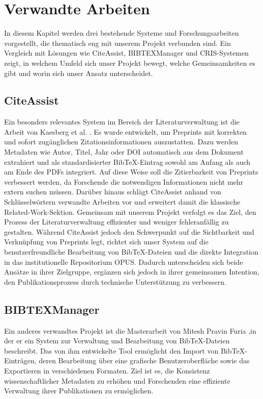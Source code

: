 \chapter{Verwandte Arbeiten}
In diesem Kapitel werden drei bestehende Systeme und Forschungsarbeiten 
vorgestellt, die thematisch eng mit unserem Projekt verbunden sind. 
Ein Vergleich mit Lösungen wie CiteAssist, BIBTEXManager und CRIS-Systemen 
zeigt, in welchem Umfeld sich unser Projekt bewegt, welche Gemeinsamkeiten 
es gibt und worin sich unser Ansatz unterscheidet.

\section{CiteAssist}
Ein besonders relevantes System im Bereich der Literaturverwaltung ist die Arbeit von  
Kaesberg et al. \cite{kaesberg2024citeassist}. 
Es wurde entwickelt, um Preprints mit korrekten und sofort 
zugänglichen Zitationsinformationen auszustatten. Dazu werden 
Metadaten wie Autor, Titel, Jahr oder DOI automatisch aus dem 
Dokument extrahiert und als standardisierter BibTeX-Eintrag 
sowohl am Anfang als auch am Ende des PDFs integriert. Auf 
diese Weise soll die Zitierbarkeit von Preprints verbessert 
werden, da Forschende die notwendigen Informationen nicht 
mehr extern suchen müssen. Darüber hinaus schlägt CiteAssist 
anhand von Schlüsselwörtern verwandte Arbeiten vor und 
erweitert damit die klassische Related-Work-Sektion. 
Gemeinsam mit unserem Projekt verfolgt es das Ziel, 
den Prozess der Literaturverwaltung effizienter und 
weniger fehleranfällig zu gestalten. Während CiteAssist 
jedoch den Schwerpunkt auf die Sichtbarkeit und Verknüpfung 
von Preprints legt, richtet sich unser System auf die 
benutzerfreundliche Bearbeitung von BibTeX-Dateien und 
die direkte Integration in das institutionelle Repositorium 
OPUS. Dadurch unterscheiden sich beide Ansätze in ihrer 
Zielgruppe, ergänzen sich jedoch in ihrer gemeinsamen Intention, 
den Publikationsprozess durch technische Unterstützung zu verbessern.

\section{BIBTEXManager}

Ein anderes  verwandtes Projekt ist die Masterarbeit von Mitesh Pravin Furia \cite{furia2009},in der er  ein 
System zur Verwaltung und Bearbeitung von Bib\TeX{}-Dateien beschreibt. 
Das von ihm  entwickelte Tool ermöglicht den Import von Bib\TeX{}-Einträgen, 
deren Bearbeitung über eine grafische Benutzeroberfläche sowie das Exportieren 
in verschiedenen Formaten. Ziel ist es, die Konsistenz wissenschaftlicher 
Metadaten zu erhöhen und Forschenden eine effiziente Verwaltung ihrer 
Publikationen zu ermöglichen.\\

